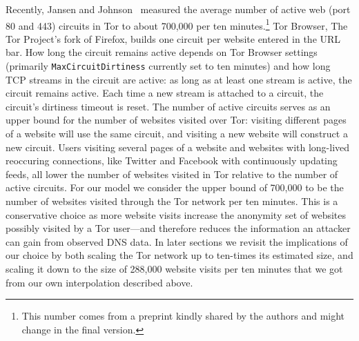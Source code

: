 Recently, Jansen and Johnson~\cite{Jansen2016a} measured the average
number of active web (port 80 and 443) circuits in Tor to about 700,000 per ten
minutes.\footnote{This number comes from a preprint kindly
shared by the authors and might change in the final version.}
Tor Browser, The Tor Project's fork of Firefox, builds one circuit per
website entered in the URL bar. How long the circuit remains active depends on
Tor Browser settings (primarily {\tt MaxCircuitDirtiness} currently set to ten
minutes) and how long TCP streams in the circuit are active: as long as at
least one stream is active, the circuit remains active.  Each time a new stream
is attached to a circuit, the circuit's dirtiness timeout is reset.
The number of active circuits serves as an
upper bound for the number of websites visited over Tor: visiting different
pages of a website will use the same circuit, and visiting a new website will
construct a new circuit.  Users visiting several pages of a website and websites
with long-lived reoccuring connections, like Twitter and Facebook with
continuously updating feeds,
all lower the number of websites visited in Tor relative to the number of active
circuits. 
For our model we consider the upper bound of 700,000 to be the number
of websites visited through the Tor network per ten minutes. This is a
conservative choice as more website visits increase the anonymity set of
websites possibly visited by a Tor user---and therefore reduces the
information an attacker can gain from observed DNS data. 
In later sections we revisit the implications of our choice by both
scaling the Tor network up to ten-times its estimated size, and scaling
it down to the size of 288,000 website visits per ten minutes that we
got from our own interpolation described above. 

